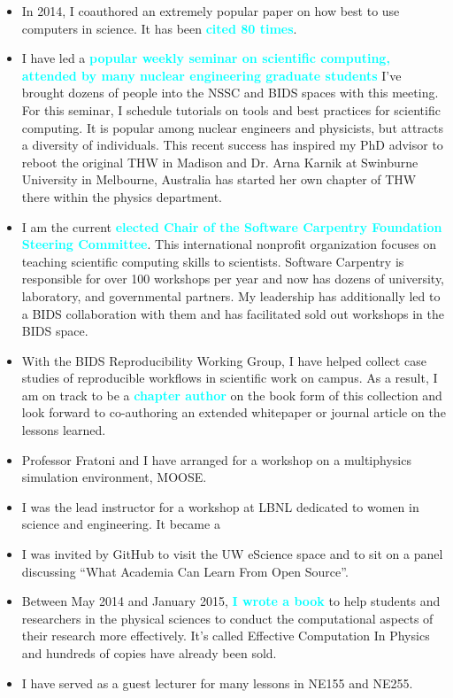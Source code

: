 \documentclass[a4paper, 10pt]{article}
\newcommand{\myitem}[1]{\item[\textcolor{gray}{\textbf{#1}}]}
\newcommand{\boldblue}[1]{\textcolor{cyan}{\textbf{#1}}}
\begin{document}
\begin{itemize}
\myitem{Best Practices} In 2014, I coauthored an extremely popular paper on how 
best to use computers in science\cite{wilson_best_2014}. It has been 
\textcolor{cyan}{\textbf{cited 80 times}}.
\myitem{The Hacker Within} I have led a \boldblue{popular weekly seminar on 
scientific computing, attended by many nuclear engineering graduate students} 
I've brought dozens of people into the NSSC and BIDS spaces with this meeting. 
For this seminar, I schedule tutorials on tools and best practices for 
scientific computing. It is popular among nuclear engineers and physicists, but 
attracts a diversity of individuals. This recent success has inspired my PhD 
advisor to reboot the original THW in Madison and Dr. Arna Karnik at Swinburne 
University in Melbourne, Australia has started her own chapter of THW there 
within the physics department.
\myitem{Software Carpentry} I am the current \boldblue{elected Chair 
of the Software Carpentry Foundation Steering Committee}. This international 
nonprofit organization focuses on teaching scientific computing skills to 
scientists.  Software Carpentry is responsible for over 100 workshops per year 
and now has dozens of university, laboratory, and governmental partners.  My 
leadership has additionally led to a BIDS collaboration with them and has 
facilitated sold out workshops in the BIDS space. 
\myitem{Case Studies} With the BIDS Reproducibility Working Group, I
have helped collect case studies of reproducible workflows in scientific work 
on campus. As a result, I am on track to be a \boldblue{chapter author} on the book form 
of this collection and look forward to co-authoring an extended whitepaper or 
journal article on the lessons learned.
\myitem{MOOSE Workshop} Professor Fratoni and I have arranged for a workshop on a
multiphysics simulation environment, MOOSE.
\myitem{WiSE Workshop} I was the lead instructor for a workshop at LBNL 
dedicated to women in science and engineering. It became a 
\myitem{GitHub Town Hall} I was invited by GitHub to visit the UW eScience space
and to sit on a panel discussing ``What Academia Can Learn From Open Source''.
\myitem{O'Reilly Book} Between May 2014 and January 2015, \boldblue{I wrote a 
book} to help students and researchers in the physical sciences to conduct the 
computational aspects of their research more effectively. It's called Effective 
Computation In Physics and hundreds of copies have already been sold.
\myitem{Guest Lectures} I have served as a guest lecturer for many lessons in 
NE155 and NE255.
\end{itemize}
\end{document}
